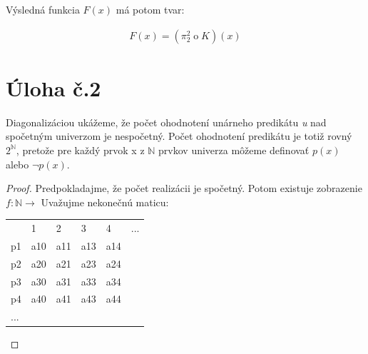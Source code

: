 \documentclass[10pt]{article}
\begin{document}
Výsledná funkcia $F(x)$ má potom tvar:

\begin{align*}
    F(x) = (\pi_2^2 \mathbin{o} K) (x)
\end{align*}

\section*{Úloha č.2}
Diagonalizáciou ukážeme, že počet ohodnotení unárneho predikátu \textit{u} nad spočetným univerzom je nespočetný. Počet ohodnotení predikátu je totiž rovný $2^{\mathbb{N}}$, pretože pre každý prvok x z $\mathbb{N}$ prvkov univerza môžeme definovať $p(x)$ alebo $\neg p(x)$.

\begin{proof}
    Predpokladajme, že počet realizácii je spočetný. Potom existuje zobrazenie $f: \mathbb{N} \to$ 
    Uvažujme nekonečnú maticu:
\begin{table}[]
\begin{tabular}{llllll}
    & 1   & 2   & 3    & 4  & ... \\
p1  & a10 & a11 & a13  & a14 &     \\
p2  & a20 & a21 & a23  & a24 &     \\
p3  & a30 & a31 & a33  & a34 &     \\
p4  & a40 & a41 & a43  & a44 &     \\
... &     &   &   &   &
\end{tabular}
\end{table}


\end{proof}
\end{document}
